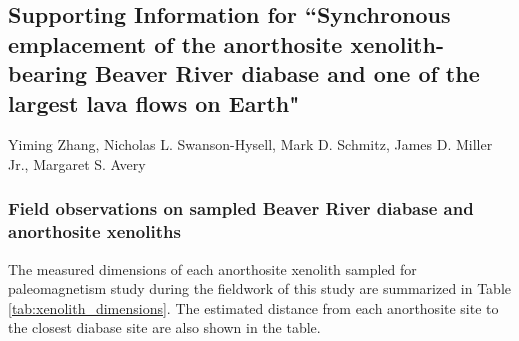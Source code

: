 \documentclass[11pt,letterpaper]{article}
\begin{document}
\renewcommand{\thefigure}{SI\arabic{figure}}
\renewcommand{\thetable}{SI\arabic{table}}
\subsection*{Supporting Information for ``Synchronous emplacement of the anorthosite xenolith-bearing Beaver River diabase and one of the largest lava flows on Earth"}
Yiming Zhang, Nicholas L. Swanson-Hysell, Mark D. Schmitz, James D. Miller Jr., Margaret S. Avery

\subsubsection*{Field observations on sampled Beaver River diabase and anorthosite xenoliths}

The measured dimensions of each anorthosite xenolith sampled for paleomagnetism study during the fieldwork of this study are summarized in Table \ref{tab:xenolith_dimensions}. The estimated distance from each anorthosite site to the closest diabase site are also shown in the table.
\end{document}
